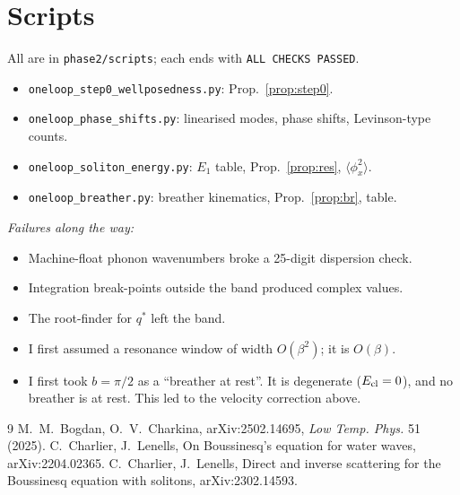 \documentclass[11pt,a4paper]{article}
\theoremstyle{remark}\newtheorem{remark}[proposition]{Remark}
\begin{document}
\appendix\section{Scripts}
All are in \texttt{phase2/scripts}; each ends with \texttt{ALL CHECKS PASSED}.
\begin{itemize}
\item \texttt{oneloop\_step0\_wellposedness.py}: Prop.~\ref{prop:step0}.
\item \texttt{oneloop\_phase\_shifts.py}: linearised modes, phase shifts, Levinson-type counts.
\item \texttt{oneloop\_soliton\_energy.py}: $E_1$ table, Prop.~\ref{prop:res}, $\langle\phi_x^2\rangle$.
\item \texttt{oneloop\_breather.py}: breather kinematics, Prop.~\ref{prop:br}, table.
\end{itemize}
\emph{Failures along the way:}
\begin{itemize}
\item Machine-float phonon wavenumbers broke a 25-digit dispersion check.
\item Integration break-points outside the band produced complex values.
\item The root-finder for $q^*$ left the band.
\item I first assumed a resonance window of width $O(\beta^2)$; it is $O(\beta)$.
\item I first took $b=\pi/2$ as a ``breather at rest''. It is degenerate ($E_{\rm cl}=0$), and no breather is at rest. This led to the velocity correction above.
\end{itemize}

\begin{thebibliography}{9}\small
{} M.~M.~Bogdan, O.~V.~Charkina, arXiv:2502.14695, \emph{Low Temp. Phys.} 51 (2025).
 C.~Charlier, J.~Lenells, On Boussinesq's equation for water waves, arXiv:2204.02365.
 C.~Charlier, J.~Lenells, Direct and inverse scattering for the Boussinesq equation with solitons, arXiv:2302.14593.
\end{thebibliography}
\end{document}
